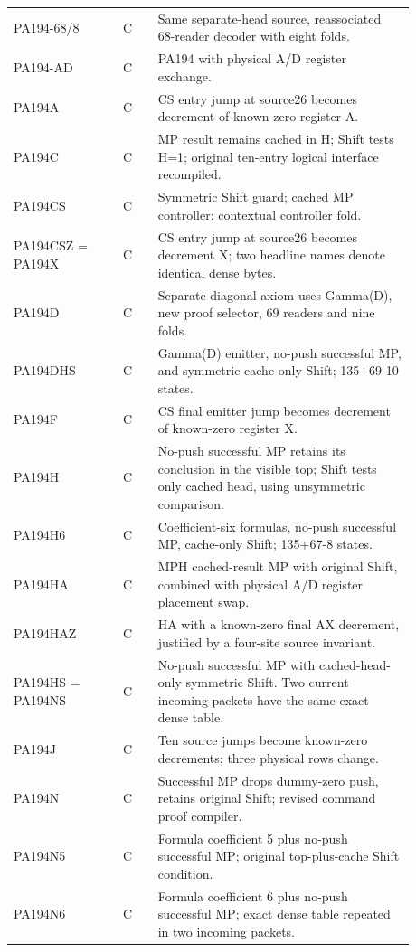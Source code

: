 \begin{longtable}{@{}p{0.24\linewidth}cp{0.64\linewidth}@{}}
PA194-68/8 & C & Same separate-head source, reassociated 68-reader decoder with eight folds.\\[4pt]
PA194-AD & C & PA194 with physical A/D register exchange.\\[4pt]
PA194A & C & CS entry jump at source26 becomes decrement of known-zero register A.\\[4pt]
PA194C & C & MP result remains cached in H; Shift tests H=1; original ten-entry logical interface recompiled.\\[4pt]
PA194CS & C & Symmetric Shift guard; cached MP controller; contextual controller fold.\\[4pt]
PA194CSZ = PA194X & C & CS entry jump at source26 becomes decrement X; two headline names denote identical dense bytes.\\[4pt]
PA194D & C & Separate diagonal axiom uses Gamma(D), new proof selector, 69 readers and nine folds.\\[4pt]
PA194DHS & C & Gamma(D) emitter, no-push successful MP, and symmetric cache-only Shift; 135+69-10 states.\\[4pt]
PA194F & C & CS final emitter jump becomes decrement of known-zero register X.\\[4pt]
PA194H & C & No-push successful MP retains its conclusion in the visible top; Shift tests only cached head, using unsymmetric comparison.\\[4pt]
PA194H6 & C & Coefficient-six formulas, no-push successful MP, cache-only Shift; 135+67-8 states.\\[4pt]
PA194HA & C & MPH cached-result MP with original Shift, combined with physical A/D register placement swap.\\[4pt]
PA194HAZ & C & HA with a known-zero final AX decrement, justified by a four-site source invariant.\\[4pt]
PA194HS = PA194NS & C & No-push successful MP with cached-head-only symmetric Shift. Two current incoming packets have the same exact dense table.\\[4pt]
PA194J & C & Ten source jumps become known-zero decrements; three physical rows change.\\[4pt]
PA194N & C & Successful MP drops dummy-zero push, retains original Shift; revised command proof compiler.\\[4pt]
PA194N5 & C & Formula coefficient 5 plus no-push successful MP; original top-plus-cache Shift condition.\\[4pt]
PA194N6 & C & Formula coefficient 6 plus no-push successful MP; exact dense table repeated in two incoming packets.\\[4pt]

\end{longtable}
